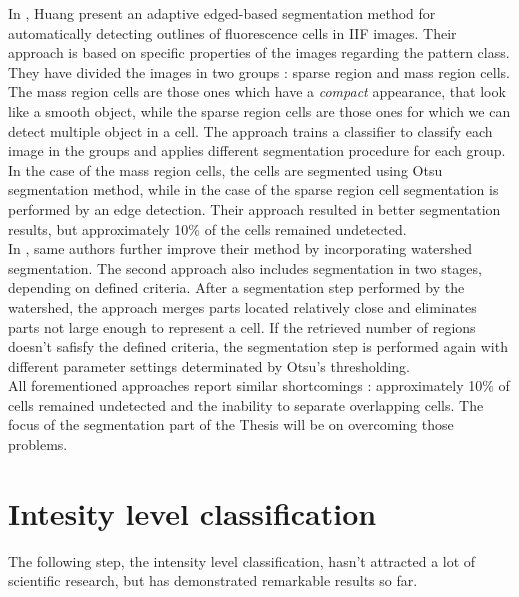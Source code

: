 In \cite{Huang2008}, Huang  present an adaptive edged-based segmentation method for automatically detecting outlines of fluorescence cells in IIF images. Their approach is based on specific properties of the images regarding the pattern class. They have divided the images in two groups : sparse region and mass region cells. The mass region cells are those ones which have a \textit{compact} appearance, that look like a smooth object, while the sparse region cells are those ones for which we can detect multiple object in a cell. The approach trains a classifier to classify each image in the groups and applies different segmentation procedure for each group. In the case of the mass region cells, the cells are segmented using Otsu segmentation method, while in the case of the sparse region cell segmentation is performed by an edge detection. Their approach resulted in better segmentation results, but approximately 10\% of the cells remained undetected. \\

In \cite{HuangWatershed}, same authors further improve their method by incorporating watershed segmentation. The second approach also includes segmentation in two stages, depending on defined criteria. After a segmentation step performed by the watershed, the approach merges parts located relatively close and eliminates parts not large enough to represent a cell. If the retrieved number of regions doesn't safisfy the defined criteria, the segmentation step is performed again with different parameter settings determinated by Otsu's thresholding. \\

All forementioned approaches report similar shortcomings : approximately 10\% of cells remained undetected and the inability to separate overlapping cells.  The focus of the segmentation part of the Thesis will be on overcoming those problems. \\




\section{Intesity level classification}

The following step, the intensity level classification, hasn't attracted a lot of scientific research, but has demonstrated remarkable results so far. \\

